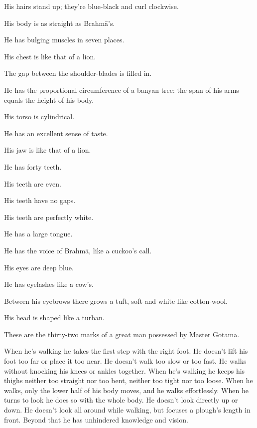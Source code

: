 \documentclass[12pt,openany]{book}%
\begin{document}
His hairs stand up; they’re blue-black and curl clockwise. 

His body is as straight as \textsanskrit{Brahmā}’s. 

He has bulging muscles in seven places. 

His chest is like that of a lion. 

The gap between the shoulder-blades is filled in. 

He has the proportional circumference of a banyan tree: the span of his arms equals the height of his body. 

His torso is cylindrical. 

He has an excellent sense of taste. 

His jaw is like that of a lion. 

He has forty teeth. 

His teeth are even. 

His teeth have no gaps. 

His teeth are perfectly white. 

He has a large tongue. 

He has the voice of \textsanskrit{Brahmā}, like a cuckoo’s call. 

His eyes are deep blue. 

He has eyelashes like a cow’s. 

Between his eyebrows there grows a tuft, soft and white like cotton-wool. 

His head is shaped like a turban. 

These are the thirty-two marks of a great man possessed by Master Gotama. 

When he’s walking he takes the first step with the right foot. He doesn’t lift his foot too far or place it too near. He doesn’t walk too slow or too fast. He walks without knocking his knees or ankles together. When he’s walking he keeps his thighs neither too straight nor too bent, neither too tight nor too loose. When he walks, only the lower half of his body moves, and he walks effortlessly. When he turns to look he does so with the whole body. He doesn’t look directly up or down. He doesn’t look all around while walking, but focuses a plough’s length in front. Beyond that he has unhindered knowledge and vision. 
\end{document}
